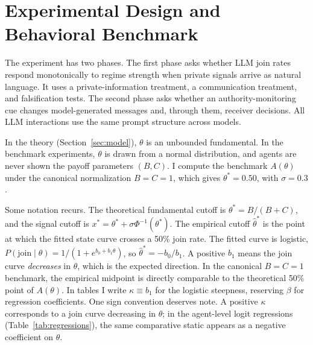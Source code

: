 \documentclass[12pt]{article}
\begin{document}
\section{Experimental Design and Behavioral Benchmark} \label{sec:design}

The experiment has two phases. The first phase asks whether LLM join rates respond monotonically to regime strength when private signals arrive as natural language. It uses a private-information treatment, a communication treatment, and falsification tests. The second phase asks whether an authority-monitoring cue changes model-generated messages and, through them, receiver decisions. All LLM interactions use the same prompt structure across models.

In the theory (Section~\ref{sec:model}), $\theta$ is an unbounded fundamental. In the benchmark experiments, $\theta$ is drawn from a normal distribution, and agents are never shown the payoff parameters $(B, C)$. I compute the benchmark $A(\theta)$ under the canonical normalization $B=C=1$, which gives $\theta^* = 0.50$, with $\sigma = 0.3$.

Some notation recurs. The theoretical fundamental cutoff is $\theta^* = B/(B+C)$, and the signal cutoff is $x^* = \theta^* + \sigma\Phi^{-1}(\theta^*)$. The empirical cutoff $\hat{\theta}^*$ is the point at which the fitted state curve crosses a 50\% join rate. The fitted curve is logistic, $P(\text{join} \mid \theta) = 1/(1 + e^{b_0 + b_1\theta})$, so $\hat{\theta}^* = -b_0/b_1$. A positive $b_1$ means the join curve \textit{decreases} in $\theta$, which is the expected direction. In the canonical $B=C=1$ benchmark, the empirical midpoint is directly comparable to the theoretical 50\% point of $A(\theta)$. In tables I write $\kappa \equiv b_1$ for the logistic steepness, reserving $\beta$ for regression coefficients. One sign convention deserves note. A positive $\kappa$ corresponds to a join curve decreasing in $\theta$; in the agent-level logit regressions (Table~\ref{tab:regressions}), the same comparative static appears as a negative coefficient on $\theta$.
\end{document}
